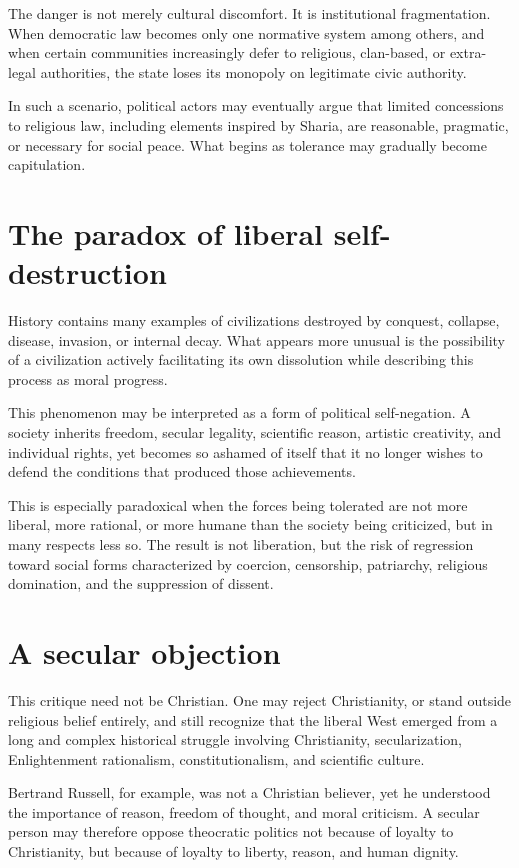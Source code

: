 \documentclass[11pt]{article}
\begin{document}
The danger is not merely cultural discomfort. It is institutional fragmentation. When democratic law becomes only one normative system among others, and when certain communities increasingly defer to religious, clan-based, or extra-legal authorities, the state loses its monopoly on legitimate civic authority.

In such a scenario, political actors may eventually argue that limited concessions to religious law, including elements inspired by Sharia, are reasonable, pragmatic, or necessary for social peace. What begins as tolerance may gradually become capitulation.

\section{The paradox of liberal self-destruction}

History contains many examples of civilizations destroyed by conquest, collapse, disease, invasion, or internal decay. What appears more unusual is the possibility of a civilization actively facilitating its own dissolution while describing this process as moral progress.

This phenomenon may be interpreted as a form of political self-negation. A society inherits freedom, secular legality, scientific reason, artistic creativity, and individual rights, yet becomes so ashamed of itself that it no longer wishes to defend the conditions that produced those achievements.

This is especially paradoxical when the forces being tolerated are not more liberal, more rational, or more humane than the society being criticized, but in many respects less so. The result is not liberation, but the risk of regression toward social forms characterized by coercion, censorship, patriarchy, religious domination, and the suppression of dissent.

\section{A secular objection}

This critique need not be Christian. One may reject Christianity, or stand outside religious belief entirely, and still recognize that the liberal West emerged from a long and complex historical struggle involving Christianity, secularization, Enlightenment rationalism, constitutionalism, and scientific culture.

Bertrand Russell, for example, was not a Christian believer, yet he understood the importance of reason, freedom of thought, and moral criticism. A secular person may therefore oppose theocratic politics not because of loyalty to Christianity, but because of loyalty to liberty, reason, and human dignity.
\end{document}
